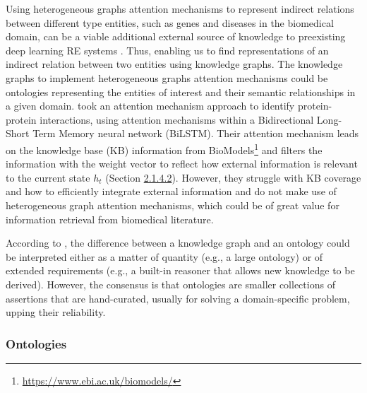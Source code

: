 Using heterogeneous graphs attention mechanisms to represent indirect relations between different type entities, such as genes and diseases in the biomedical domain, can be a viable additional external source of knowledge to preexisting deep learning RE systems \citep{wu2020comprehensive}. Thus, enabling us to find representations of an indirect relation between two entities using knowledge graphs. The knowledge graphs to implement heterogeneous graphs attention mechanisms could be ontologies representing the entities of interest and their semantic relationships in a given domain. \cite{li2020bio} took an attention mechanism approach to identify protein-protein interactions, using attention mechanisms within a Bidirectional Long-Short Term Memory neural network (BiLSTM). Their attention mechanism leads on the knowledge base (KB) information from BioModels\footnote{\url{https://www.ebi.ac.uk/biomodels/}} and filters the information with the weight vector to reflect how external information is relevant to the current state $h_t$ (Section \hyperlink{2.1.4.2}{2.1.4.2}). However, they struggle with KB coverage and how to efficiently integrate external information and do not make use of heterogeneous graph attention mechanisms, which could be of great value for information retrieval from biomedical literature. 

According to \cite{ehrlinger2016towards}, the difference between a knowledge graph and an ontology could be interpreted either as a matter of quantity (e.g., a large ontology) or of extended requirements (e.g., a built-in reasoner that allows new knowledge to be derived). However, the consensus is that ontologies are smaller collections of assertions that are hand-curated, usually for solving a domain-specific problem, upping their reliability. 


\subsubsection{Ontologies}

